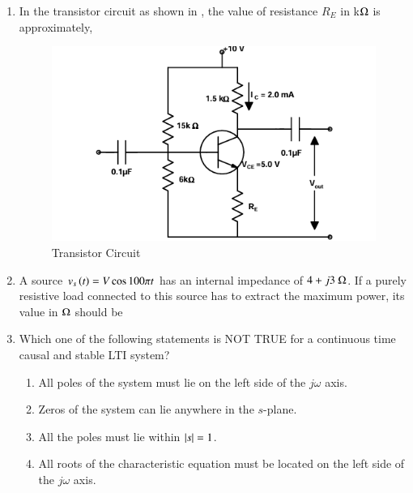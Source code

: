 \documentclass[journal,12pt,onecolumn]{IEEEtran}
\theoremstyle{remark}
\begin{document}
\begin{enumerate}
\item In the transistor circuit as shown in , the value of resistance $R_E$ in k$\ohm$ is approximately,
\par \hfill{}
\begin{figure}[H]
\includegraphics[width=0.5\columnwidth]{Figs/Q-7.png}
\caption{Transistor Circuit}
\label{7}
\end{figure}
    \begin{enumerate}
    \end{enumerate}

\item A source $v_s\left(t\right) = V \cos 100\pi t$ has an internal impedance of $4 + j 3\ \ohm$. If a purely resistive load connected to this source has to extract the maximum power, its value in $\ohm$ should be
\par \hfill{}
    \begin{enumerate}
    \end{enumerate}

\item Which one of the following statements is NOT TRUE for a continuous time causal and stable LTI system? 
\par \hfill{}
    \begin{enumerate}
    \item All poles of the system must lie on the left side of the $j\omega$ axis.
    \item Zeros of the system can lie anywhere in the $s$-plane.
    \item All the poles must lie within $\left\vert s\right\vert=1$.
    \item All roots of the characteristic equation must be located on the left side of the $j\omega$ axis.
    \end{enumerate}


\end{enumerate}
\end{document}
